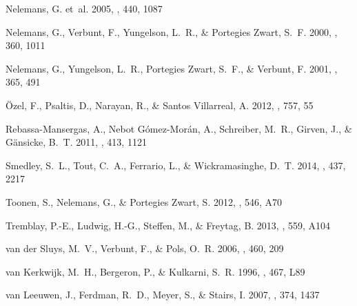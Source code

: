 \documentclass[apjl]{emulateapj}
\begin{document}
\begin{thebibliography}{41}
{Nelemans}, G. {et~al.} 2005, \aap, 440, 1087

{Nelemans}, G., {Verbunt}, F., {Yungelson}, L.~R., \& {Portegies Zwart}, S.~F.
  2000, \aap, 360, 1011

{Nelemans}, G., {Yungelson}, L.~R., {Portegies Zwart}, S.~F., \& {Verbunt}, F.
  2001, \aap, 365, 491

{{\"O}zel}, F., {Psaltis}, D., {Narayan}, R., \& {Santos Villarreal}, A. 2012,
  \apj, 757, 55

{Rebassa-Mansergas}, A., {Nebot G{\'o}mez-Mor{\'a}n}, A., {Schreiber}, M.~R.,
  {Girven}, J., \& {G{\"a}nsicke}, B.~T. 2011, \mnras, 413, 1121

{Smedley}, S.~L., {Tout}, C.~A., {Ferrario}, L., \& {Wickramasinghe}, D.~T.
  2014, \mnras, 437, 2217

{Toonen}, S., {Nelemans}, G., \& {Portegies Zwart}, S. 2012, \aap, 546, A70

{Tremblay}, P.-E., {Ludwig}, H.-G., {Steffen}, M., \& {Freytag}, B. 2013, \aap,
  559, A104

{van der Sluys}, M.~V., {Verbunt}, F., \& {Pols}, O.~R. 2006, \aap, 460, 209

{van Kerkwijk}, M.~H., {Bergeron}, P., \& {Kulkarni}, S.~R. 1996, \apjl, 467,
  L89

{van Leeuwen}, J., {Ferdman}, R.~D., {Meyer}, S., \& {Stairs}, I. 2007, \mnras,
  374, 1437


\end{thebibliography}
\end{document}
